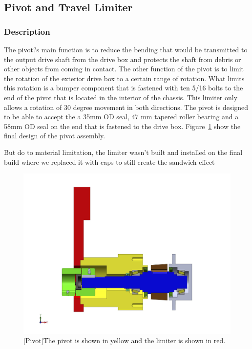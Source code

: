 \subsection{Pivot and Travel Limiter}

\subsubsection{Description}

The pivot?s main function is to reduce the bending that would be transmitted to the output drive shaft from the drive box and protects the shaft from debris or other objects from coming in contact. The other function of the pivot is to limit the rotation of the exterior drive box to a certain range of rotation. What limits this rotation is a bumper component that is fastened with ten 5/16\? bolts to the end of the pivot that is located in the interior of the chassis. This limiter only allows a rotation of 30 degree movement in both directions. The pivot is designed to be able to accept the a 35mm OD seal,  47 mm tapered roller bearing and a 58mm OD seal on the end that is fastened to the drive box. Figure~\ref{fig:pivot_assembly_drw} show the final design of the pivot assembly.

But do to material limitation, the limiter wasn't built and installed on the final build where we replaced it with caps to still create the sandwich effect

\begin{figure}[htbp]
\centering
\includegraphics[height=0.3\textheight]{./images/pivot_assembly_drw}
[Pivot]{The pivot is shown in yellow and the limiter is shown in red.}
\label{fig:pivot_assembly_drw}
\end{figure}



